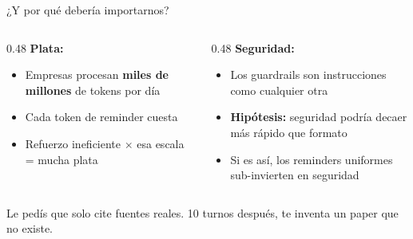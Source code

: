 \documentclass[aspectratio=169, 12pt]{beamer}
\begin{document}
\begin{frame}{¿Y por qu\'e deber\'ia importarnos?}

\begin{columns}[T]
\begin{column}{0.48\textwidth}
\textbf{Plata:}
\begin{itemize}
    \item Empresas procesan \textbf{miles de millones} de tokens por d\'ia
    \item Cada token de reminder cuesta
    \item Refuerzo ineficiente $\times$ esa escala = mucha plata
\end{itemize}
\end{column}

\begin{column}{0.48\textwidth}
\textbf{Seguridad:}
\begin{itemize}
    \item Los guardrails son instrucciones como cualquier otra
    \item \textbf{Hip\'otesis:} seguridad podr\'ia decaer m\'as r\'apido que formato
    \item Si es as\'i, los reminders uniformes \alert{sub-invierten en seguridad}
\end{itemize}
\end{column}
\end{columns}

\vspace{0.5em}

\footnotesize
Le ped\'is que solo cite fuentes reales. 10 turnos despu\'es, te inventa un paper que no existe.

\end{frame}
\end{document}
